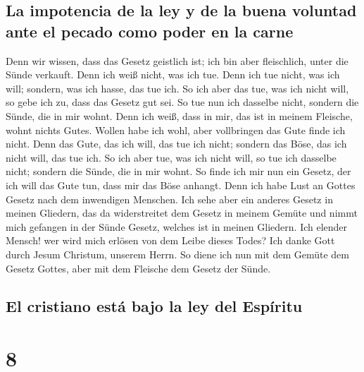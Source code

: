 \hypertarget{la-impotencia-de-la-ley-y-de-la-buena-voluntad-ante-el-pecado-como-poder-en-la-carne}{%
\subsection{La impotencia de la ley y de la buena voluntad ante el
pecado como poder en la
carne}\label{la-impotencia-de-la-ley-y-de-la-buena-voluntad-ante-el-pecado-como-poder-en-la-carne}}

 Denn wir wissen, dass das Gesetz geistlich ist; ich bin
aber fleischlich, unter die Sünde verkauft.  Denn ich
weiß nicht, was ich tue. Denn ich tue nicht, was ich will; sondern, was
ich hasse, das tue ich.  So ich aber das tue, was ich
nicht will, so gebe ich zu, dass das Gesetz gut sei.  So
tue nun ich dasselbe nicht, sondern die Sünde, die in mir wohnt.
 Denn ich weiß, dass in mir, das ist in meinem Fleische,
wohnt nichts Gutes. Wollen habe ich wohl, aber vollbringen das Gute
finde ich nicht.  Denn das Gute, das ich will, das tue
ich nicht; sondern das Böse, das ich nicht will, das tue ich.
 So ich aber tue, was ich nicht will, so tue ich dasselbe
nicht; sondern die Sünde, die in mir wohnt.  So finde ich
mir nun ein Gesetz, der ich will das Gute tun, dass mir das Böse
anhangt.  Denn ich habe Lust an Gottes Gesetz nach dem
inwendigen Menschen.  Ich sehe aber ein anderes Gesetz in
meinen Gliedern, das da widerstreitet dem Gesetz in meinem Gemüte und
nimmt mich gefangen in der Sünde Gesetz, welches ist in meinen Gliedern.
 Ich elender Mensch! wer wird mich erlösen von dem Leibe
dieses Todes?  Ich danke Gott durch Jesum Christum,
unserem Herrn. So diene ich nun mit dem Gemüte dem Gesetz Gottes, aber
mit dem Fleische dem Gesetz der Sünde.

\hypertarget{el-cristiano-estuxe1-bajo-la-ley-del-espuxedritu}{%
\subsection{El cristiano está bajo la ley del
Espíritu}\label{el-cristiano-estuxe1-bajo-la-ley-del-espuxedritu}}

\hypertarget{section-7}{%
\section{8}\label{section-7}}

